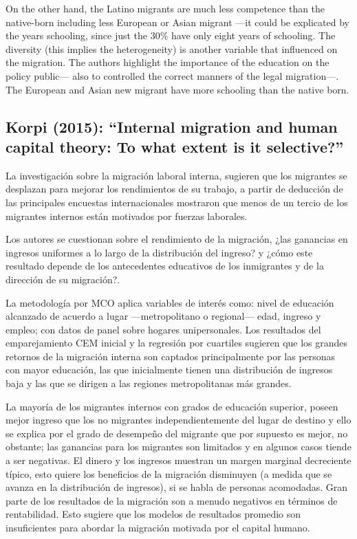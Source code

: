 \documentclass[11pt]{article}
\theoremstyle{prop}
\begin{document}
	On the other hand, the Latino migrants are much less competence than the native-born including less European or Asian migrant —it could be explicated by the years schooling, since just the 30\% have only eight years of schooling. The diversity (this implies the heterogeneity) is another variable that influenced on the migration. The authors highlight the importance of the education on the policy public— also to controlled the correct manners of the legal migration—. The European and Asian new migrant have more schooling than the native born.
	
	\subsection{Korpi (2015): ``Internal migration and human capital theory: To what extent is it selective?''}
	La investigación sobre la migración laboral interna, sugieren que los migrantes se desplazan para mejorar los rendimientos de su trabajo, a partir de deducción de las principales encuestas internacionales mostraron que menos de un tercio de los migrantes internos están motivados por fuerzas laborales. 
	
	Los autores se cuestionan sobre el rendimiento de la migración, ¿las ganancias en ingresos uniformes a lo largo de la distribución del ingreso? y ¿cómo este resultado depende de los antecedentes educativos de los inmigrantes y de la dirección de su migración?.
	
	La metodología por MCO aplica variables de interés como: nivel de educación alcanzado de acuerdo a lugar --–metropolitano o regional–-- edad, ingreso y empleo; con datos de panel sobre hogares unipersonales. Los resultados del emparejamiento CEM inicial y la regresión por cuartiles sugieren que los grandes retornos de la migración interna son captados principalmente por las personas con mayor educación, las que inicialmente tienen una distribución de ingresos baja y las que se dirigen a las regiones metropolitanas más grandes.
	
	La mayoría de los migrantes internos con grados de educación superior, poseen mejor ingreso que los no migrantes independientemente del lugar de destino y ello se explica por el grado de desempeño del migrante que por supuesto es mejor, no obstante; las ganancias para los migrantes son limitados y en algunos casos tiende a ser negativas. El dinero y los ingresos muestran un margen marginal decreciente típico, esto quiere los beneficios de la migración disminuyen (a medida que se avanza en la distribución de ingresos), si se habla de personas acomodadas. Gran parte de los resultados de la migración son a menudo negativos en términos de rentabilidad. Esto sugiere que los modelos de resultados promedio son insuficientes para abordar la migración motivada por el capital humano.
	
\end{document}
